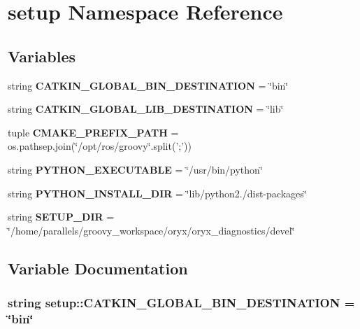 \section{setup \-Namespace \-Reference}
\label{namespacesetup}
\subsection*{\-Variables}
\begin{DoxyCompactItemize}
\item 
string {\bf \-C\-A\-T\-K\-I\-N\-\_\-\-G\-L\-O\-B\-A\-L\-\_\-\-B\-I\-N\-\_\-\-D\-E\-S\-T\-I\-N\-A\-T\-I\-O\-N} = \char`\"{}bin\char`\"{}
\item 
string {\bf \-C\-A\-T\-K\-I\-N\-\_\-\-G\-L\-O\-B\-A\-L\-\_\-\-L\-I\-B\-\_\-\-D\-E\-S\-T\-I\-N\-A\-T\-I\-O\-N} = \char`\"{}lib\char`\"{}
\item 
tuple {\bf \-C\-M\-A\-K\-E\-\_\-\-P\-R\-E\-F\-I\-X\-\_\-\-P\-A\-T\-H} = os.\-pathsep.\-join(\char`\"{}/opt/ros/groovy\char`\"{}.split(';'))
\item 
string {\bf \-P\-Y\-T\-H\-O\-N\-\_\-\-E\-X\-E\-C\-U\-T\-A\-B\-L\-E} = \char`\"{}/usr/bin/python\char`\"{}
\item 
string {\bf \-P\-Y\-T\-H\-O\-N\-\_\-\-I\-N\-S\-T\-A\-L\-L\-\_\-\-D\-I\-R} = \char`\"{}lib/python2./dist-\/packages\char`\"{}
\item 
string {\bf \-S\-E\-T\-U\-P\-\_\-\-D\-I\-R} = \char`\"{}/home/parallels/groovy\-\_\-workspace/oryx/oryx\-\_\-diagnostics/devel\char`\"{}
\end{DoxyCompactItemize}


\subsection{\-Variable \-Documentation}
\subsubsection[{\-C\-A\-T\-K\-I\-N\-\_\-\-G\-L\-O\-B\-A\-L\-\_\-\-B\-I\-N\-\_\-\-D\-E\-S\-T\-I\-N\-A\-T\-I\-O\-N}]{\setlength{\rightskip}{0pt plus 5cm}string {\bf setup\-::\-C\-A\-T\-K\-I\-N\-\_\-\-G\-L\-O\-B\-A\-L\-\_\-\-B\-I\-N\-\_\-\-D\-E\-S\-T\-I\-N\-A\-T\-I\-O\-N} = \char`\"{}bin\char`\"{}}\label{namespacesetup_ad6d0d2d2612bf52d17f8f976115653be}


